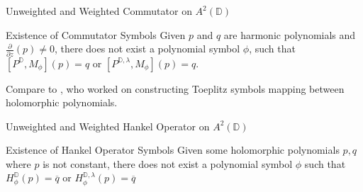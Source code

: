 \documentclass{reu_beamer}
\begin{document}
\begin{frame}{Unweighted and Weighted Commutator on $A^2(\mathbb{D})$}
    \begin{block}{Existence of Commutator Symbols}
        Given $p$ and $q$ are harmonic polynomials and $\frac{\partial}{\partial z} (p)\not=0$, there does not exist a polynomial symbol $\phi$, such that $\left[P^{\mathbb{D}},M_\phi\right](p)=q$ or $\left[P^{\mathbb{D},\lambda},M_\phi\right](p)=q$. 
    \end{block}
    Compare to \cite{AshleyAdenCelikDanielLuke2024}, who worked on constructing Toeplitz symbols mapping between holomorphic polynomials.
\end{frame}
\begin{frame}{Unweighted and Weighted Hankel Operator on $A^2(\mathbb{D})$}
    \begin{block}{Existence of Hankel Operator Symbols}
        Given some holomorphic polynomials $p,q$ where $p$ is not constant, there does not exist a polynomial symbol $\phi$ such that $H^{\mathbb{D}}_\phi(p)=\overline{q}$ or $H^{\mathbb{D},\lambda}_\phi(p)=\overline{q}$  
    \end{block}
\end{frame}
\end{document}
